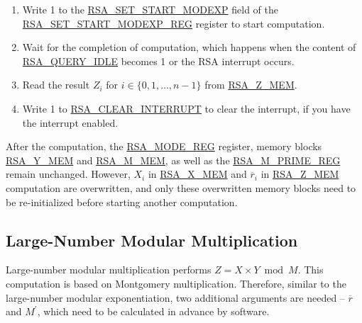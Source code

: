 \documentclass[main\_\_EN.tex]{subfiles}
\begin{document}
\begin{enumerate}
       Users need to write data to each memory block only according to the length of the number; data beyond this length is ignored.

    \item Write 1 to the \hyperref[fielddesc:RSASETSTARTMODEXP]{RSA\_SET\_START\_MODEXP} field of the \hyperref[regdesc:RSASETSTARTMODEXPREG]{RSA\_SET\_START\_MODEXP\_REG} register to start computation.

    \item Wait for the completion of computation, which happens when the content of \hyperref[fielddesc:RSAQUERYIDLE]{RSA\_QUERY\_IDLE} becomes 1 or the RSA interrupt occurs.

    \item Read the result \begin{math}Z_{i}\end{math}
        for \begin{math}i \in \{ 0, 1, \dots, n-1 \} \end{math}
        from \hyperref[regdesc:RSAmemory]{RSA\_Z\_MEM}.

    \item Write 1 to \hyperref[fielddesc:RSACLEARINTERRUPT]{RSA\_CLEAR\_INTERRUPT} to clear the interrupt, if you have the interrupt enabled.

\end{enumerate}

After the computation, the \hyperref[regdesc:RSAMODEREG]{RSA\_MODE\_REG} register, memory blocks \hyperref[regdesc:RSAmemory]{RSA\_Y\_MEM} and \hyperref[regdesc:RSAmemory]{RSA\_M\_MEM}, as well as the \hyperref[regdesc:RSAMPRIMEREG]{RSA\_M\_PRIME\_REG} remain unchanged. However, \begin{math}X_{i}\end{math} in \hyperref[regdesc:RSAmemory]{RSA\_X\_MEM} and \begin{math}\overline{r}_{i}\end{math} in \hyperref[regdesc:RSAmemory]{RSA\_Z\_MEM} computation are overwritten, and only these overwritten memory blocks need to be re-initialized before starting another computation.

\subsection{Large-Number Modular Multiplication}

Large-number modular multiplication performs \begin{math}Z = X \times Y \bmod M\end{math}. This computation is based on Montgomery multiplication.
Therefore, similar to the large-number modular exponentiation, two additional arguments are needed -- \begin{math}\overline{r}\end{math} and
\begin{math}M^{\prime}\end{math}, which need to be calculated in advance by software.
\end{document}
